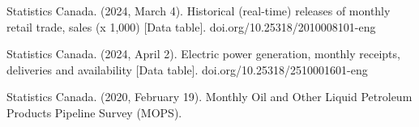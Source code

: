 \documentclass[12pt]{article}
\begin{document}
Statistics Canada. (2024, March 4). Historical (real-time) releases of monthly retail trade, sales (x 1,000) [Data table]. doi.org/10.25318/2010008101-eng
\vspace{0.5cm}

Statistics Canada. (2024, April 2). Electric power generation, monthly receipts, deliveries and availability [Data table]. doi.org/10.25318/2510001601-eng
\vspace{0.5cm}

Statistics Canada. (2020, February 19). Monthly Oil and Other Liquid Petroleum Products Pipeline Survey (MOPS).
\end{document}
